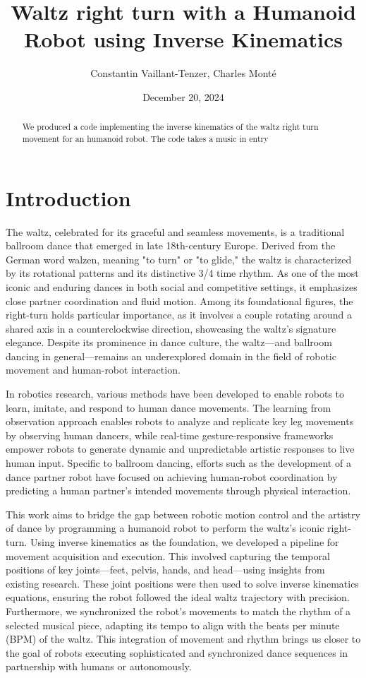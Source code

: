 \documentclass{amsart}
\date{December 20, 2024}
\title{Waltz right turn with a Humanoid Robot using Inverse Kinematics}
\author{Constantin Vaillant-Tenzer, Charles Monté}
\theoremstyle{definition}
\theoremstyle{plain}
\begin{document}
\maketitle

\begin{abstract}
We produced a code implementing the inverse kinematics of the waltz right turn movement for an humanoid robot. The code takes a music in entry 
\end{abstract}


\section{Introduction}

The waltz, celebrated for its graceful and seamless movements, is a traditional ballroom dance that emerged in late 18th-century Europe. Derived from the German word walzen, meaning "to turn" or "to glide," the waltz is characterized by its rotational patterns and its distinctive 3/4 time rhythm. As one of the most iconic and enduring dances in both social and competitive settings, it emphasizes close partner coordination and fluid motion. Among its foundational figures, the right-turn holds particular importance, as it involves a couple rotating around a shared axis in a counterclockwise direction, showcasing the waltz's signature elegance. Despite its prominence in dance culture, the waltz—and ballroom dancing in general—remains an underexplored domain in the field of robotic movement and human-robot interaction.

In robotics research, various methods have been developed to enable robots to learn, imitate, and respond to human dance movements. The learning from observation approach \cite{traditional_jap_dance} enables robots to analyze and replicate key leg movements by observing human dancers, while real-time gesture-responsive frameworks \cite{spectacle_imitation} empower robots to generate dynamic and unpredictable artistic responses to live human input. Specific to ballroom dancing, efforts such as the development of a dance partner robot \cite{ballroom_dance} have focused on achieving human-robot coordination by predicting a human partner's intended movements through physical interaction.

This work aims to bridge the gap between robotic motion control and the artistry of dance by programming a humanoid robot to perform the waltz's iconic right-turn. Using inverse kinematics as the foundation, we developed a pipeline for movement acquisition and execution. This involved capturing the temporal positions of key joints—feet, pelvis, hands, and head—using insights from existing research. These joint positions were then used to solve inverse kinematics equations, ensuring the robot followed the ideal waltz trajectory with precision. Furthermore, we synchronized the robot's movements to match the rhythm of a selected musical piece, adapting its tempo to align with the beats per minute (BPM) of the waltz. This integration of movement and rhythm brings us closer to the goal of robots executing sophisticated and synchronized dance sequences in partnership with humans or autonomously.
\end{document}
